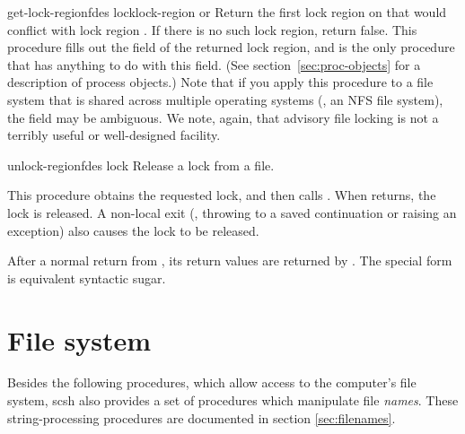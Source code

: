 \begin{defundesc}{get-lock-region}{fdes lock}{lock-region or \sharpf}
Return the first lock region on  that would conflict with 
lock region .
If there is no such lock region, return false.
This procedure fills out the  field of the returned lock region,
and is the only procedure that has anything to do with this field.
(See section~\ref{sec:proc-objects} for a description of process objects.)
Note that if you apply this procedure to a file system that is shared
across multiple operating systems (\ie, an NFS file system), the 
field may be ambiguous.
We note, again, that {\Posix} advisory file locking is not a terribly useful
or well-designed facility.
\end{defundesc}

\begin{defundesc}{unlock-region}{fdes lock}{\undefined}
Release a lock from a file.
\end{defundesc}

\begin{desc}
This procedure obtains the requested lock, and then calls 
. When  returns, the lock is released.
A non-local exit (\eg, throwing to a saved continuation or raising
an exception) also causes the lock to be released.

After a normal return from , its return values are returned
by .
The  special form is equivalent syntactic sugar.
\end{desc}



\section{File system}

Besides the following procedures, which allow access to the
computer's file system, scsh also provides a set of procedures
which manipulate file \emph{names}. These string-processing
procedures are documented in section \ref{sec:filenames}.

